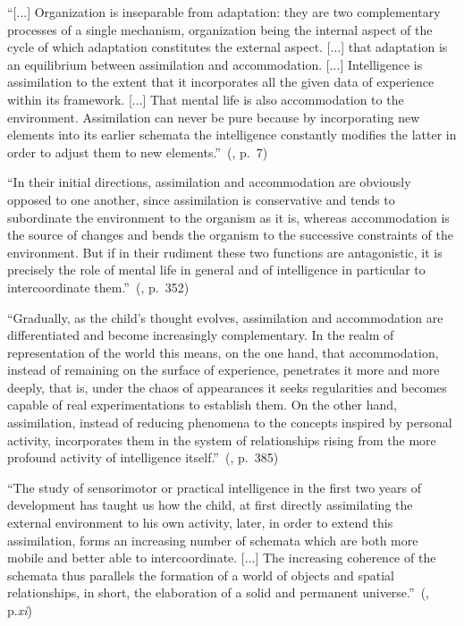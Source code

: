 \documentclass[runningheads]{llncs}
\begin{document}
\begin{adjustwidth}{1cm}{1cm}
``[...] Organization is inseparable from adaptation: they are two complementary processes of a single mechanism, organization being the internal aspect of the cycle of which adaptation constitutes the external aspect. [...] that adaptation is an equilibrium between assimilation and accommodation. [...] Intelligence is assimilation to the extent that it incorporates all the given data of experience within its framework. [...] That mental life is also accommodation to the environment. Assimilation can never be pure because by incorporating new elements into its earlier schemata the intelligence constantly modifies the latter in order to adjust them to new elements.''~(\cite{piaget_origins_1955}, p.~7)

``In their initial directions, assimilation and accommodation are obviously opposed to one another, since assimilation is conservative and tends to subordinate the environment to the organism as it is, whereas accommodation is the source of changes and bends the organism to the successive constraints of the environment. But if in their rudiment these two functions are antagonistic, it is precisely the role of mental life in general and of intelligence in particular to intercoordinate them.''~(\cite{piaget_reality_1955}, p.~352)

``Gradually, as the child's thought evolves, assimilation and accommodation are differentiated and become increasingly complementary. 
In the realm of representation of the world this means, on the one hand, that accommodation, instead of remaining on the surface of experience, penetrates it more and more deeply, that is, under the chaos of appearances it seeks regularities and becomes capable of real experimentations to establish them. 
On the other hand, assimilation, instead of reducing phenomena to the concepts inspired by personal activity, incorporates them in the system of relationships rising from the more profound activity of intelligence itself.''~(\cite{piaget_reality_1955}, p.~385)

``The study of sensorimotor or practical intelligence in the first two years of development has taught us how the child, at first directly assimilating the external environment to his own activity, later, in order to extend this assimilation, forms an increasing number of schemata which are both more mobile and better able to intercoordinate.
[...] The increasing coherence of the schemata thus parallels the formation of a world of objects and spatial relationships, in short, the elaboration of a solid and permanent universe.''~(\cite{piaget_reality_1955}, p.\textit{xi})
\\

\end{adjustwidth}
\end{document}
